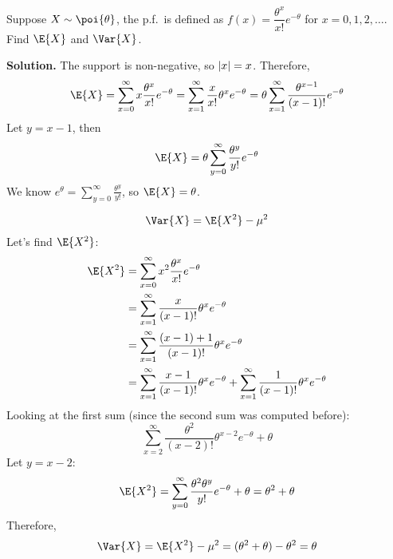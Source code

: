 \begin{Example}{}{}
    Suppose $ X \sim \poi{\theta} $, the p.f.\ is defined as
    $ f(x)=\dfrac{\theta^x}{x!} e^{-\theta} $
    for $ x=0,1,2,\ldots $. Find $ \E{X} $ and $ \Var{X} $.

    \textbf{Solution.} The support is non-negative, so $ \lvert x\rvert=x $.
    Therefore,
    \[ \E{X}=\sum\limits_{x=0}^{\infty} x \frac{\theta^x}{x!} e^{-\theta}
        =\sum\limits_{x=1}^{\infty} \frac{x}{x!} \theta^x e^{-\theta}
        =\theta \sum\limits_{x=1}^{\infty} \frac{\theta^{x-1}}{(x-1)!}
        e^{-\theta}  \]
    Let $ y=x-1 $, then
    \[ \E{X}= \theta\sum\limits_{y=0}^{\infty} \frac{\theta^y}{y!} e^{-\theta} \]
    We know $\displaystyle  e^{\theta}=\sum\limits_{y=0}^{\infty} \frac{\theta^y}{y!} $,
    so $ \E{X}= \theta $.

    \[ \Var{X}=\E{X^2}-\mu^2 \]
    Let's find $ \E{X^2} $:
    \begin{align*}
        \E{X^2}
         & =\sum\limits_{x=0}^{\infty} x^2 \frac{\theta^x}{x!} e^{-\theta}         \\
         & =\sum\limits_{x=1}^{\infty} \frac{x}{(x-1)!}\theta^x e^{-\theta}        \\
         & =\sum\limits_{x=1}^{\infty} \frac{(x-1)+1}{(x-1)!} \theta^x e^{-\theta} \\
         & =\sum\limits_{x=1}^{\infty} \frac{x-1}{(x-1)!}\theta^x e^{-\theta}+
        \sum\limits_{x=1}^{\infty} \frac{1}{(x-1)!}\theta^x e^{-\theta}
    \end{align*}
    Looking at the first sum (since the second sum was computed before):
    \[ \sum\limits_{x=2}^{\infty} \frac{\theta^2}{(x-2)!} \theta^{x-2}e^{-\theta}+\theta \]
    Let $ y=x-2 $:
    \[ \E{X^2}=\sum\limits_{y=0}^{\infty}\frac{\theta^2\theta^y}{y!}e^{-\theta}+\theta=
        \theta^2+\theta   \]
    Therefore,
    \[ \Var{X}=\E{X^2}-\mu^2=(\theta^2+\theta)-\theta^2=\theta \]
\end{Example}
